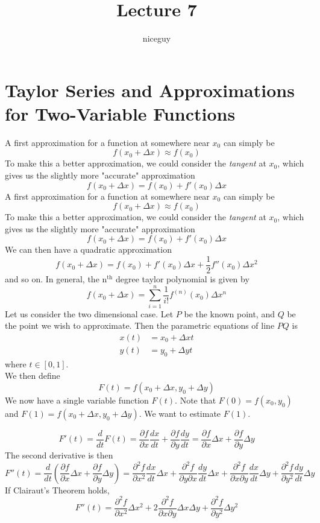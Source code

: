 \documentclass[12pt]{article}
\author{niceguy}
\title{Lecture 7}
\begin{document}
\maketitle

\section{Taylor Series and Approximations for Two-Variable Functions}

A first approximation for a function at somewhere near $x_0$ can simply be
$$f(x_0+\Delta x) \approx f(x_0)$$
To make this a better approximation, we could consider the \textit{tangent} at $x_0$, which gives us the slightly more "accurate" approximation
$$f(x_0+\Delta x) = f(x_0) + f'(x_0)\Delta x$$A first approximation for a function at somewhere near $x_0$ can simply be
$$f(x_0+\Delta x) \approx f(x_0)$$
To make this a better approximation, we could consider the \textit{tangent} at $x_0$, which gives us the slightly more "accurate" approximation
$$f(x_0+\Delta x) = f(x_0) + f'(x_0)\Delta x$$
We can then have a quadratic approximation
$$f(x_0+\Delta x) = f(x_0) + f'(x_0)\Delta x + \frac{1}{2}f''(x_0)\Delta x^2$$
and so on. In general, the n$^{\text{th}}$ degree taylor polynomial is given by
$$f(x_0+\Delta x) = \sum_{i=1}^n \frac{1}{i!}f^{(n)}(x_0) \Delta x^n$$
Let us consider the two dimensional case. Let $P$ be the known point, and $Q$ be the point we wish to approximate. Then the parametric equations of line $PQ$ is
\begin{align*}
	x(t) &= x_0 + \Delta x t \\
	y(t) &= y_0 + \Delta y t
\end{align*}
where $t \in [0,1]$. \\
We then define
$$F(t) = f(x_0+\Delta x, y_0+\Delta y)$$
We now have a single variable function $F(t)$. Note that $F(0) = f(x_0,y_0)$ and $F(1) = f(x_0+\Delta x, y_0+\Delta y)$. We want to estimate $F(1)$.

$$F'(t) = \frac{d}{dt}F(t) = \frac{\partial f}{\partial x} \frac{dx}{dt} + \frac{\partial f}{\partial y} \frac{dy}{dt} = \frac{\partial f}{\partial x} \Delta x + \frac{\partial f}{\partial y}\Delta y$$
The second derivative is then
$$F''(t) = \frac{d}{dt}\left(\frac{\partial f}{\partial x}\Delta x + \frac{\partial f}{\partial y} \Delta y\right) = \frac{\partial^2 f}{\partial x^2} \frac{dx}{dt} \Delta x + \frac{\partial^2 f}{\partial y \partial x} \frac{dy}{dt} \Delta x + \frac{\partial^2 f}{\partial x \partial y} \frac{dx}{dt} \Delta y + \frac{\partial^2 f}{\partial y^2} \frac{dy}{dt} \Delta y$$
If Clairaut's Theorem holds,
$$F''(t) = \frac{\partial^2 f}{\partial x^2} \Delta x^2 + 2\frac{\partial^2 f}{\partial x \partial y} \Delta x \Delta y + \frac{\partial^2 f}{\partial y^2} \Delta y^2$$
\end{document}
